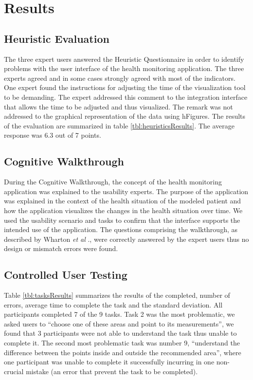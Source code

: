 \documentclass[twocolumn]{bmcart}%
\begin{document}
\section*{Results}

\subsection*{Heuristic Evaluation}

The three expert users answered the Heuristic Questionnaire in order to identify problems with the user interface of the health monitoring application. The three experts agreed and in some cases strongly agreed with most of the indicators. One expert found the instructions for adjusting the time of the visualization tool to be demanding. The expert addressed this comment to the integration interface that allows the time to be adjusted and thus visualized. The remark was not addressed to the graphical representation of the data using hFigures. The results of the evaluation are summarized in table \ref{tbl:heuristicsResults}. The average response was 6.3 out of 7 points.


\subsection*{Cognitive Walkthrough}


During the Cognitive Walkthrough, the concept of the health monitoring application was explained to the usability experts. The purpose of the application was explained in the context of the health situation of the modeled patient and how the application visualizes the changes in the health situation over time. We used the usability scenario and tasks to confirm that the interface supports the intended use of the application. The questions comprising the walkthrough, as described by Wharton \textit{et al} \cite{wharton1994cognitive}., were correctly answered by the expert users thus no design or mismatch errors were found.

\subsection*{Controlled User Testing}

Table \ref{tbl:tasksResults} summarizes the results of the completed, number of errors, average time to complete the task and the standard deviation. All participants completed 7 of the 9 tasks. Task 2 was the most problematic, we asked users to ``choose one of these areas and point to its measurements'', we found that 3 participants were not able to understand the task thus unable to complete it. The second most problematic task was number 9, ``understand the difference between the points inside and outside the recommended area'', where one participant was unable to complete it successfully incurring in one non-crucial mistake (an error that prevent the task to be completed). 
\end{document}
